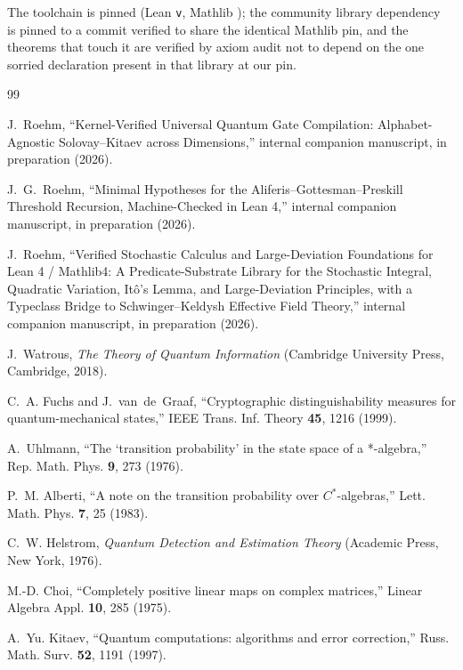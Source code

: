 \documentclass[aps,pra,reprint,nofootinbib,superscriptaddress]{revtex4-2}
\theoremstyle{plain}
\theoremstyle{definition}
\theoremstyle{remark}
\begin{document}
The toolchain is pinned (Lean \texttt{v\leantoolchain}, Mathlib
\texttt{\mathlibrev}); the community library
dependency~\cite{Meiburg2025PhysLib} is pinned to a commit verified to
share the identical Mathlib pin, and the theorems that touch it are
verified by axiom audit not to depend on the one sorried declaration
present in that library at our pin.

\begin{thebibliography}{99}

J.~Roehm,
``Kernel-Verified Universal Quantum Gate Compilation: Alphabet-Agnostic Solovay--Kitaev across Dimensions,''
internal companion manuscript, in preparation (2026).

J.~G.~Roehm,
``Minimal Hypotheses for the Aliferis--Gottesman--Preskill Threshold Recursion, Machine-Checked in Lean 4,''
internal companion manuscript, in preparation (2026).

J.~Roehm,
``Verified Stochastic Calculus and Large-Deviation Foundations for Lean 4 / Mathlib4: A Predicate-Substrate Library for the Stochastic Integral, Quadratic Variation, It\^o's Lemma, and Large-Deviation Principles, with a Typeclass Bridge to Schwinger--Keldysh Effective Field Theory,''
internal companion manuscript, in preparation (2026).

J.~Watrous,
\emph{The Theory of Quantum Information}
(Cambridge University Press, Cambridge, 2018).

C.~A. Fuchs and J.~van~de~Graaf,
``Cryptographic distinguishability measures for quantum-mechanical
states,''
IEEE Trans. Inf. Theory \textbf{45}, 1216 (1999).

A.~Uhlmann,
``The `transition probability' in the state space of a *-algebra,''
Rep. Math. Phys. \textbf{9}, 273 (1976).

P.~M. Alberti,
``A note on the transition probability over $C^*$-algebras,''
Lett. Math. Phys. \textbf{7}, 25 (1983).

C.~W. Helstrom,
\emph{Quantum Detection and Estimation Theory}
(Academic Press, New York, 1976).

M.-D. Choi,
``Completely positive linear maps on complex matrices,''
Linear Algebra Appl. \textbf{10}, 285 (1975).

A.~Yu. Kitaev,
``Quantum computations: algorithms and error correction,''
Russ. Math. Surv. \textbf{52}, 1191 (1997).


\end{thebibliography}
\end{document}
